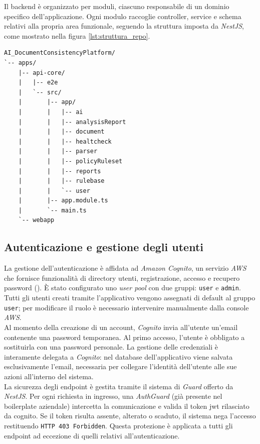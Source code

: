 Il backend è organizzato per moduli, ciascuno responsabile di un dominio specifico dell'applicazione. Ogni modulo raccoglie controller, service e schema relativi alla propria area funzionale, seguendo la struttura imposta da \emph{NestJS}, come mostrato nella figura \ref{lst:struttura_repo}.

\begin{lstlisting}[label={lst:struttura_repo}]
AI_DocumentConsistencyPlatform/
`-- apps/
    |-- api-core/
    |   |-- e2e
    |   `-- src/
    |       |-- app/
    |       |   |-- ai
    |       |   |-- analysisReport
    |       |   |-- document
    |       |   |-- healtcheck
    |       |   |-- parser
    |       |   |-- policyRuleset
    |       |   |-- reports
    |       |   |-- rulebase
    |       |   `-- user
    |       |-- app.module.ts
    |       `-- main.ts
    `-- webapp
\end{lstlisting}

\subsection{Autenticazione e gestione degli utenti}
La gestione dell'autenticazione è affidata ad \emph{Amazon Cognito}, un servizio \emph{AWS} che fornisce funzionalità di directory utenti, registrazione, accesso e recupero password (\cite{site:cognito}). È stato configurato uno \emph{user pool} con due gruppi: \texttt{user} e \texttt{admin}. Tutti gli utenti creati tramite l'applicativo vengono assegnati di default al gruppo \texttt{user}; per modificare il ruolo è necessario intervenire manualmente dalla console \emph{AWS}.\\

Al momento della creazione di un account, \emph{Cognito} invia all'utente un'email contenente una password temporanea. Al primo accesso, l'utente è obbligato a sostituirla con una password personale. La gestione delle credenziali è interamente delegata a \emph{Cognito}: nel database dell'applicativo viene salvata esclusivamente l'email, necessaria per collegare l'identità dell'utente alle sue azioni all'interno del sistema.\\

La sicurezza degli endpoint è gestita tramite il sistema di \textit{Guard} offerto da \emph{NestJS}. Per ogni richiesta in ingresso, una \textit{AuthGuard} (già presente nel boilerplate aziendale) intercetta la comunicazione e valida il token \gls{jwt} rilasciato da \gls{cognito}. Se il token risulta assente, alterato o scaduto, il sistema nega l'accesso restituendo \texttt{HTTP 403 Forbidden}. Questa protezione è applicata a tutti gli endpoint ad eccezione di quelli relativi all'autenticazione.\\

